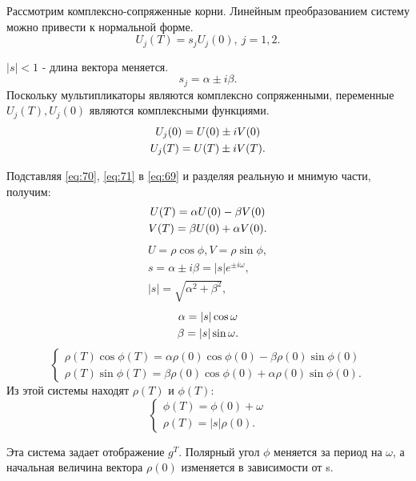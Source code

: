 Рассмотрим комплексно-сопряженные корни. Линейным преобразованием систему можно привести к нормальной форме.
\begin{equation}
	U_j(T)=s_j U_j(0), ~j=1,2.
	\label{eq:69}
\end{equation}

$|s|<1$ - длина вектора меняется.
\begin{equation}
	s_j=\alpha \pm i\beta.
	\label{eq:70}
\end{equation}
Поскольку мультипликаторы являются комплексно сопряженными, переменные $U_j(T), U_j(0)$ являются комплексными функциями. 
\begin{gather}
	U_j(0)=U(0)\pm iV(0) \notag \\ 
	U_j(T)=U(T)\pm iV(T).		
	\label{eq:71}
\end{gather}

Подставляя \eqref{eq:70}, \eqref{eq:71} в \eqref{eq:69} и разделяя реальную и мнимую части, получим:
\begin{gather}
	U(T)=\alpha U(0)- \beta V(0) \notag \\ 
	V(T)=\beta U(0)+ \alpha V(0).		
	\label{eq:72}
\end{gather}
\begin{gather*}
	U=\rho \cos{\phi}, V=\rho \sin{\phi}, \\ 
	s=\alpha \pm i\beta=|s|e^{\pm i \omega}, \\
	|s|=\sqrt{\alpha^2+\beta^2},		
\end{gather*}
\begin{gather}
	\alpha=|s|\cos{\omega} \notag \\ 
	\beta=|s|\sin{\omega}.		
	\label{eq:73}
\end{gather}
\begin{equation}
	\begin{cases}
		\rho(T)\cos{\phi(T)}=\alpha \rho(0)\cos{\phi(0)}-\beta \rho(0)\sin{\phi(0)} \\
		\rho(T)\sin{\phi(T)}=\beta \rho(0)\cos{\phi(0)}+\alpha \rho(0)\sin{\phi(0)}.
	\end{cases}
	\label{eq:74}
\end{equation}
Из этой системы находят $\rho(T)$ и $\phi(T)$:
\begin{equation}
	\begin{cases}
		\phi(T)=\phi(0)+\omega \\
		\rho(T)=|s|\rho(0).
	\end{cases}
	\label{eq:75}
\end{equation}

Эта система задает отображение $g^T$. Полярный угол $\phi$ меняется за период на $\omega$, а начальная величина вектора $\rho(0)$ изменяется в зависимости от s. 

